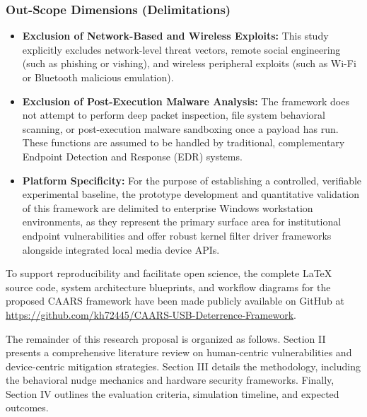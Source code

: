 \documentclass{ieeeaccess}
\begin{document}
\subsubsection{Out-Scope Dimensions (Delimitations)}
\begin{itemize}
    \item \textbf{Exclusion of Network-Based and Wireless Exploits:} This study explicitly excludes network-level threat vectors, remote social engineering (such as phishing or vishing), and wireless peripheral exploits (such as Wi-Fi or Bluetooth malicious emulation).
    \item \textbf{Exclusion of Post-Execution Malware Analysis:} The framework does not attempt to perform deep packet inspection, file system behavioral scanning, or post-execution malware sandboxing once a payload has run. These functions are assumed to be handled by traditional, complementary Endpoint Detection and Response (EDR) systems.
    \item \textbf{Platform Specificity:} For the purpose of establishing a controlled, verifiable experimental baseline, the prototype development and quantitative validation of this framework are delimited to enterprise Windows workstation environments, as they represent the primary surface area for institutional endpoint vulnerabilities and offer robust kernel filter driver frameworks alongside integrated local media device APIs.
\end{itemize}
To support reproducibility and facilitate open science, the complete LaTeX source code, system architecture blueprints, and workflow diagrams for the proposed CAARS framework have been made publicly available on GitHub at \url{https://github.com/kh72445/CAARS-USB-Deterrence-Framework}.

The remainder of this research proposal is organized as follows. Section II presents a comprehensive literature review on human-centric vulnerabilities and device-centric mitigation strategies. Section III details the methodology, including the behavioral nudge mechanics and hardware security frameworks. Finally, Section IV outlines the evaluation criteria, simulation timeline, and expected outcomes.



\end{document}
